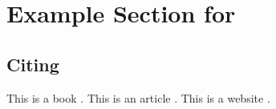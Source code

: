\chapter{Example Section for \texttt{\classname}}\label{ch:ex}
\section{Citing}
This is a book \cite{Evans15}. This is an article \cite{Ben02}. This is a 
website \cite{FAUreg}.

